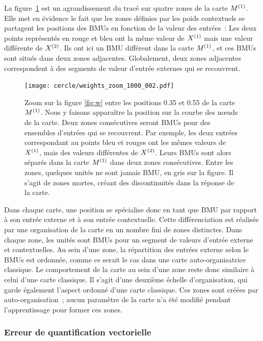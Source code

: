 \documentclass[../main]{subfiles}
\begin{document}
La figure~\ref{fig:w_zoom} est un agrandissement du tracé sur quatre zones de la carte $M^{({1})}$.
Elle met en évidence le fait que les zones définies par les poids contextuels se partagent les positions des BMUs en fonction de la valeur des entrées~:
Les deux points représentés en rouge et bleu ont la même valeur de $X^{({1})}$ mais une valeur différente de $X^{({2})}$. 
Ils ont ici un BMU différent dans la carte $M^{({1})}$, et ces BMUs sont situés dans deux zones adjacentes.
Globalement, deux zones adjacentes correspondent à des segments de valeur d'entrée externes qui se recouvrent.

\begin{figure}[h!]
	\centering\texttt{[image: cercle/weights\_zoom\_1000\_002.pdf]}
   \caption{Zoom sur la figure \ref{fig:w} entre les positions 0.35 et 0.55 de la carte $M^{({1})}$. 
   Nous y faisons apparaître la position sur la courbe des n\oe{}uds de la carte.
   Deux zones consécutives seront BMUs pour des ensembles d'entrées qui se recouvrent. Par exemple, les deux entrées correspondant au points bleu et rouges ont les mêmes valeurs de $X^{({1})}$, mais des valeurs différentes de $X^{({2})}$. Leurs BMUs sont alors séparés dans la carte $M^{({1})}$ dans deux zones consécutives.
   Entre les zones, quelques unités ne sont jamais BMU, en gris sur la figure. Il s'agit de zones mortes, créant des discontinuités dans la réponse de la carte.
   \label{fig:w_zoom}}
\end{figure}

Dans chaque carte, une position se spécialise donc en tant que BMU par rapport à son entrée externe et à son entrée contextuelle.
Cette différenciation est réalisée par une organisation de la carte en un nombre fini de zones distinctes. Dans chaque zone, les unités sont BMUs pour un segment de valeurs d'entrée externe et contextuelles. Au sein d'une zone, la répartition des entrées externe selon le BMUs est ordonnée, comme ce serait le cas dans une carte auto-organisatrice classique. Le comportement de la carte au sein d'une zone reste donc similaire à celui d'une carte classique.
Il s'agit d'une deuxième échelle d'organisation, qui garde également l'aspect ordonné d'une carte classique. 
Ces zones sont créées par auto-organisation~; aucun paramètre de la carte n'a été modifié pendant l'apprentissage pour former ces zones.

\subsubsection{Erreur de quantification vectorielle}
\end{document}
